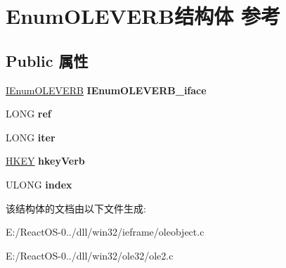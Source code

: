 \hypertarget{struct_enum_o_l_e_v_e_r_b}{}\section{Enum\+O\+L\+E\+V\+E\+R\+B结构体 参考}
\label{struct_enum_o_l_e_v_e_r_b}
\subsection*{Public 属性}
\begin{DoxyCompactItemize}
\item 
\mbox{\label{struct_enum_o_l_e_v_e_r_b_a4448917cb08c6eba167e1288d2480728}} 
\hyperlink{interface_i_enum_o_l_e_v_e_r_b}{I\+Enum\+O\+L\+E\+V\+E\+RB} {\bfseries I\+Enum\+O\+L\+E\+V\+E\+R\+B\+\_\+iface}
\item 
\mbox{\label{struct_enum_o_l_e_v_e_r_b_a3fcc26bc28de09187fd8887ae2b77628}} 
L\+O\+NG {\bfseries ref}
\item 
\mbox{\label{struct_enum_o_l_e_v_e_r_b_a87a336d2bae0a6c6f9d7db206437d141}} 
L\+O\+NG {\bfseries iter}
\item 
\mbox{\label{struct_enum_o_l_e_v_e_r_b_a8acd02e6cb463d1572f9322848c4c442}} 
\hyperlink{interfacevoid}{H\+K\+EY} {\bfseries hkey\+Verb}
\item 
\mbox{\label{struct_enum_o_l_e_v_e_r_b_a04f10988e5bf32b32b5137b4545f9a11}} 
U\+L\+O\+NG {\bfseries index}
\end{DoxyCompactItemize}


该结构体的文档由以下文件生成\+:\begin{DoxyCompactItemize}
\item 
E\+:/\+React\+O\+S-\/0../dll/win32/ieframe/oleobject.\+c\item 
E\+:/\+React\+O\+S-\/0../dll/win32/ole32/ole2.\+c\end{DoxyCompactItemize}
